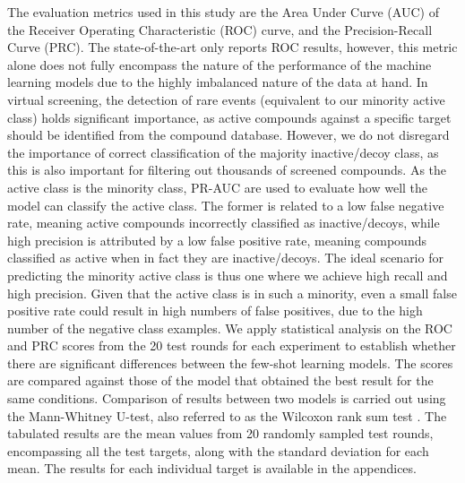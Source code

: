 The evaluation metrics used in this study are the Area Under Curve (AUC) of the Receiver Operating Characteristic (ROC) curve, and the Precision-Recall Curve (PRC). The state-of-the-art \cite{altae2017low} only reports ROC results, however, this metric alone does not fully encompass the nature of the performance of the machine learning models due to the highly imbalanced nature of the data at hand. In virtual screening, the detection of rare events (equivalent to our minority active class) holds significant importance, as active compounds against a specific target should be identified from the compound database. However, we do not disregard the importance of correct classification of the majority inactive/decoy class, as this is also important for filtering out thousands of screened compounds. As the active class is the minority class, PR-AUC are used to evaluate how well the model can classify the active class. The former is related to a low false negative rate, meaning active compounds incorrectly classified as inactive/decoys, while high precision is attributed by a low false positive rate, meaning compounds classified as active when in fact they are inactive/decoys. The ideal scenario for predicting the minority active class is thus one where we achieve high recall and high precision. Given that the active class is in such a minority, even a small false positive rate could result in high numbers of false positives, due to the high number of the negative class examples. We apply statistical analysis on the ROC and PRC scores from the 20 test rounds for each experiment to establish whether there are significant differences between the few-shot learning models. The scores are compared against those of the model that obtained the best result for the same conditions. Comparison of results between two models is carried out using the Mann-Whitney U-test, also referred to as the Wilcoxon rank sum test \citep{mann1947test}. The tabulated results are the mean values from 20 randomly sampled test rounds, encompassing all the test targets, along with the standard deviation for each mean. The results for each individual target is available in the appendices.
